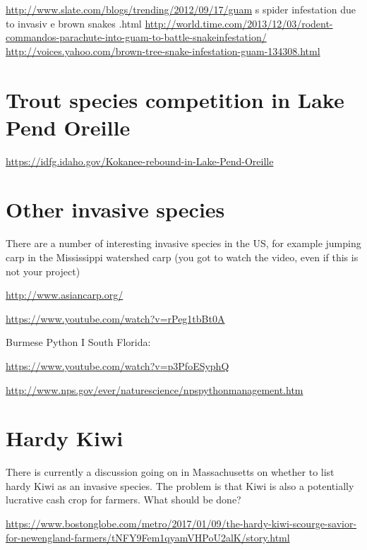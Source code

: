 \documentclass[10pt]{article}
\begin{document}
\href{http://www.slate.com/blogs/trending/2012/09/17/guam}{http://www.slate.com/blogs/trending/2012/09/17/guam} s spider infestation due to invasiv e brown snakes .html \href{http://world.time.com/2013/12/03/rodent-commandos-parachute-into-guam-to-battle-snakeinfestation/}{http://world.time.com/2013/12/03/rodent-commandos-parachute-into-guam-to-battle-snakeinfestation/} \href{http://voices.yahoo.com/brown-tree-snake-infestation-guam-134308.html}{http://voices.yahoo.com/brown-tree-snake-infestation-guam-134308.html}

\section{Trout species competition in Lake Pend Oreille}
\href{https://idfg.idaho.gov/Kokanee-rebound-in-Lake-Pend-Oreille}{https://idfg.idaho.gov/Kokanee-rebound-in-Lake-Pend-Oreille}

\section{Other invasive species}
There are a number of interesting invasive species in the US, for example jumping carp in the Mississippi watershed carp (you got to watch the video, even if this is not your project)

\href{http://www.asiancarp.org/}{http://www.asiancarp.org/}

\href{https://www.youtube.com/watch?v=rPeg1tbBt0A}{https://www.youtube.com/watch?v=rPeg1tbBt0A}

Burmese Python I South Florida:

\href{https://www.youtube.com/watch?v=p3PfoESyphQ}{https://www.youtube.com/watch?v=p3PfoESyphQ}

\href{http://www.nps.gov/ever/naturescience/npspythonmanagement.htm}{http://www.nps.gov/ever/naturescience/npspythonmanagement.htm}

\section{Hardy Kiwi}
There is currently a discussion going on in Massachusetts on whether to list hardy Kiwi as an invasive species. The problem is that Kiwi is also a potentially lucrative cash crop for farmers. What should be done?

\href{https://www.bostonglobe.com/metro/2017/01/09/the-hardy-kiwi-scourge-savior-for-newengland-farmers/tNFY9Fem1qyamVHPoU2alK/story.html}{https://www.bostonglobe.com/metro/2017/01/09/the-hardy-kiwi-scourge-savior-for-newengland-farmers/tNFY9Fem1qyamVHPoU2alK/story.html}
\end{document}
